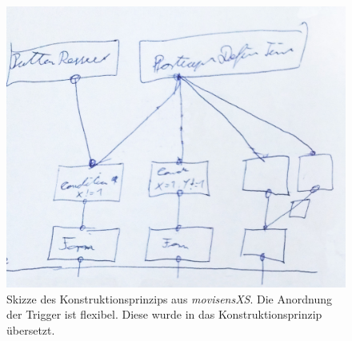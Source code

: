 \begin{figure}
   \begin{minipage}[b]{.65\linewidth} %
      \includegraphics[width=\linewidth]{pictures/triggersetkons}
      \caption{Skizze des Konstruktionsprinzips aus \emph{movisensXS}. Die Anordnung der Trigger ist flexibel. Diese wurde in das Konstruktionsprinzip übersetzt.}
      \label{triggersetkons}
   \end{minipage}
   \hspace{.01\linewidth}%
   \begin{minipage}[b]{.325\linewidth} %

\end{minipage}
\end{figure}
